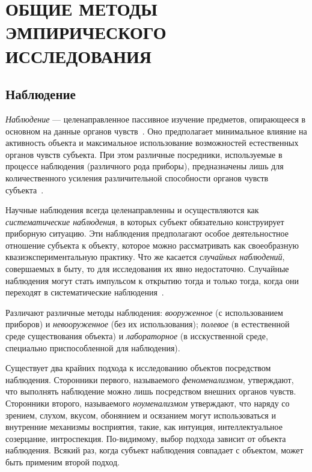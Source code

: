\section[Общие методы эмпирического исследования]{%
  ОБЩИЕ МЕТОДЫ ЭМПИРИЧЕСКОГО \\
  ИССЛЕДОВАНИЯ
}

\subsection{Наблюдение}

\emph{Наблюдение} --- целенаправленное пассивное изучение предметов,
опирающееся в основном на данные органов чувств~\cite{nekrasov2010}.
Оно предполагает минимальное влияние на активность объекта и максимальное
использование возможностей естественных органов чувств субъекта.
При этом различные посредники, используемые в процессе наблюдения
(различного рода приборы), предназначены лишь для количественного усиления
различительной способности органов чувств субъекта~\cite{moiseev2004}.

Научные наблюдения всегда целенаправленны и осуществляются как
\emph{систематические наблюдения},
в которых субъект обязательно конструирует приборную ситуацию.
Эти наблюдения предполагают особое деятельностное отношение субъекта к объекту,
которое можно рассматривать как своеобразную квазиэкспериментальную практику.
Что же касается \emph{случайных наблюдений}, совершаемых в быту,
то для исследования их явно недостаточно.
Случайные наблюдения могут стать импульсом к открытию тогда и только тогда,
когда они переходят в систематические наблюдения~\cite{stepin1999}.

Различают различные методы наблюдения:
\emph{вооруженное} (с использованием приборов) и \emph{невооруженное} (без их использования);
\emph{полевое} (в естественной среде существования объекта) и
\emph{лабораторное} (в исскуственной среде, специально приспособленной для наблюдения).

Существует два крайних подхода к исследованию объектов посредством наблюдения.
Сторонники первого, называемого \emph{феноменализмом}, утверждают,
что выполнять наблюдение можно лишь посредством внешних органов чувств.
Сторонники второго, называемого \emph{ноуменализмом} утверждают,
что наряду со зрением, слухом, вкусом, обонянием и осязанием
могут использоваться и внутренние механизмы восприятия,
такие, как интуиция, интеллектуальное созерцание, интроспекция.
По-видимому, выбор подхода зависит от объекта наблюдения.
Всякий раз, когда субъект наблюдения совпадает с объектом,
может быть применим второй подход.

